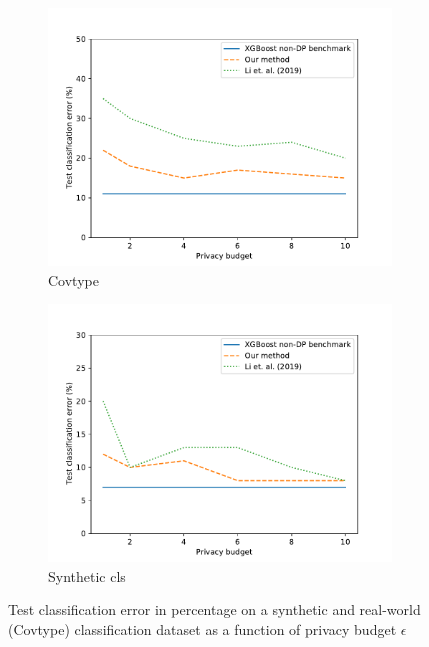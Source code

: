 \documentclass{article}
\theoremstyle{definition}
\begin{document}
\begin{figure}[h]
\begin{subfigure}{.5\textwidth}
  \centering
  \includegraphics[scale=0.5]{figs/plot_covtype_error.pdf}
  \caption{Covtype}
\end{subfigure}
\begin{subfigure}{.5\textwidth}
  \centering
  \includegraphics[scale=0.5]{figs/plot_syntheticcls_error.pdf}
  \caption{Synthetic cls}
\end{subfigure}
\caption{Test classification error in percentage on a synthetic and real-world (Covtype) classification dataset
as a function of privacy budget $\epsilon$}
\label{figError} 
\end{figure}
\end{document}
